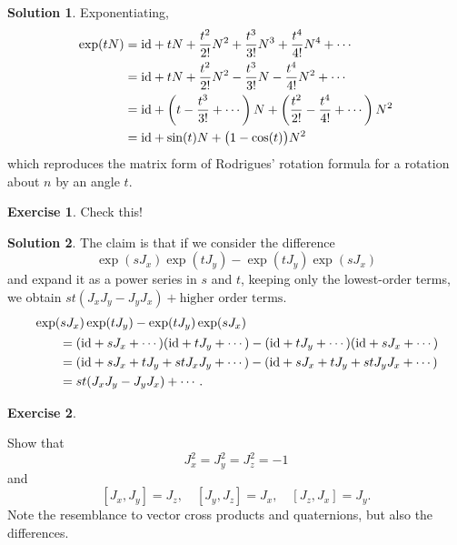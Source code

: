 \documentclass[11pt, a4paper]{report}
\theoremstyle{definition}
\newtheorem{exercise}{Exercise}[part]
\newtheorem{solution}{Solution}[part]
\newenvironment{ex}{\begin{exercise}}{\end{exercise}\pagebreak[1]}
\newenvironment{sol}{\begin{solution}}{\end{solution}\pagebreak[3]}
\newcommand*{\id}{\ensuremath\mathop{}\mathopen{}\mathrm{id}}
\begin{document}
\begin{sol}
Exponentiating,
\begin{align*}
    \exp (tN)
        &= \id + tN + \frac{t^2}{2!} N^2 + \frac{t^3}{3!} N^3
                     + \frac{t^4}{4!} N^4 + \cdots \\
        &= \id + tN + \frac{t^2}{2!} N^2 - \frac{t^3}{3!} N
                     - \frac{t^4}{4!} N^2 + \cdots \\
        &= \id + \left( t - \frac{t^3}{3!} + \cdots \right) N
              + \left( \frac{t^2}{2!} - \frac{t^4}{4!} + \cdots \right) N^2 \\
        &= \id + \sin(t) N + \bigl(1 - \cos(t) \bigr) N^2
\end{align*}
which reproduces the matrix form of Rodrigues' rotation formula for a rotation about $n$ by an angle $t$.


\end{sol}

\begin{ex}

Check this!

\end{ex}

\begin{sol}

The claim is that if we consider the difference
\[
    \exp(s J_x) \exp(t J_y) - \exp(t J_y) \exp(s J_x)
\]
and expand it as a power series in $s$ and $t$, keeping only the lowest-order terms, we obtain $st(J_x J_y - J_y J_x) + \text{higher order terms}$.
\begin{align*}
    &\exp(s J_x) \exp(t J_y) - \exp(t J_y) \exp(s J_x) \\
    &\qquad\begin{aligned}
        &= (\id + sJ_x + \cdots) (\id + tJ_y + \cdots)
           - (\id + tJ_y + \cdots) (\id + sJ_x + \cdots) \\
        &= (\id + sJ_x + tJ_y + st J_x J_y + \cdots)
           - (\id + sJ_x + tJ_y + st J_y J_x + \cdots) \\
        &= st(J_x J_y - J_y J_x) + \cdots.
    \end{aligned}
\end{align*}

\end{sol}

\begin{ex}\label{ex:so3basis}

Show that
\[
    J_x^2 = J_y^2 = J_z^2 = -1
\]
and
\[
    [J_x, J_y] = J_z, \quad
    [J_y, J_z] = J_x, \quad
    [J_z, J_x] = J_y.
\]
Note the resemblance to vector cross products and quaternions, but also the differences.

\end{ex}
\end{document}
